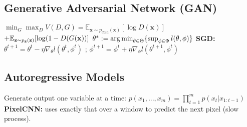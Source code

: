 \subsection*{Generative Adversarial Network (GAN)}
$\min_G \max_D V(D,G) = \mathbb{E}_{\mathbf{x}\sim p_{data}(\mathbf{x})}[\log D(\mathbf{x}) ]$ \\
$+ \mathbb{E}_{\mathbf{z}\sim p_{\mathbf{z}}(\mathbf{\mathbf{z}})}[\log (1 - D(G(\mathbf{x})) ] \\
$ $\theta^* := \operatorname*{arg\,min}_{\theta\in \Theta} \{ \sup_{\phi \in \Phi} l(\theta, \phi)\}$
\textbf{SGD:}  $\theta^{t+1} = \theta^t - \eta \nabla_\theta l(\theta^t, \phi^t)$ ; $\phi^{t+1} = \phi^t + \eta \nabla_\phi l(\theta^{t+1}, \phi^t)$ 
\subsection*{Autoregressive Models}
Generate output one variable at a time: $p(x_1, ..., x_m) = \prod_{t=1}^m p(x_t|x_{1:t-1})$ \\\textbf{PixelCNN:} uses exactly that over a window to predict the next pixel (slow process).
